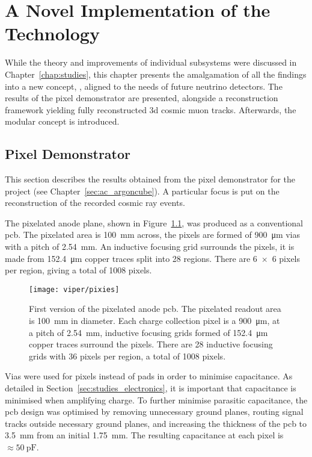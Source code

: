 \chapter{A Novel Implementation of the  Technology}
\label{chap:ac}

While the theory and improvements of individual \lartpc{} subsystems were discussed in Chapter~\ref{chap:studies}, this chapter presents the amalgamation of all the findings into a new \lartpc{} concept, \AC{}, aligned to the needs of future \lartpc{} neutrino detectors.
The results of the \AC{} pixel demonstrator are presented, alongside a reconstruction framework yielding fully reconstructed \gls{3d} cosmic muon tracks.
Afterwards, the \AC{} modular \lartpc{} concept is introduced.


\section{\AC{} Pixel Demonstrator}
\label{sec:ac_viper}

This section describes the results obtained from the pixel demonstrator for the \AC{} project (see Chapter~\ref{sec:ac_argoncube}).
A particular focus is put on the reconstruction of the recorded cosmic ray events.
 
The pixelated anode plane, shown in Figure~\ref{fig:viper_pixies}, was produced as a conventional \gls{pcb}. 
The pixelated area is \SI{100}{\milli\metre} across, the pixels are formed of \SI{900}{\micro\metre} vias with a pitch of \SI{2.54}{\milli\metre}.
An inductive focusing grid surrounds the pixels, it is made from \SI{152.4}{\micro\metre} copper traces split into 28 regions.
There are \num{6 x 6} pixels per region, giving a total of 1008 pixels. 

\begin{figure}[htb]
	\centering
	\texttt{[image: viper/pixies]}
	\caption[Pixel demonstrator readout plane]{%
		First version of the pixelated anode \acrshort{pcb}.
		The pixelated readout area is \SI{100}{\milli\metre} in diameter.
		Each charge collection pixel is a \SI{900}{\micro\metre}, at a pitch of \SI{2.54}{\milli\metre}, inductive focusing grids formed of \SI{152.4}{\micro\metre} copper traces surround the pixels.
		There are \num{28} inductive focusing grids with \num{36} pixels per region, a total of \num{1008} pixels.
	}
	\label{fig:viper_pixies}
\end{figure}

Vias were used for pixels instead of pads in order to minimise capacitance.
As detailed in Section~\ref{sec:studies_electronics}, it is important that capacitance is minimised when amplifying charge.
To further minimise parasitic capacitance, the \gls{pcb} design was optimised by removing unnecessary ground planes, routing signal tracks outside necessary ground planes, and increasing the thickness of the \gls{pcb} to \SI{3.5}{\milli\metre} from an initial \SI{1.75}{\milli\metre}. 
The resulting capacitance at each pixel is $\approx \SI{50}{\pico\farad}$.

